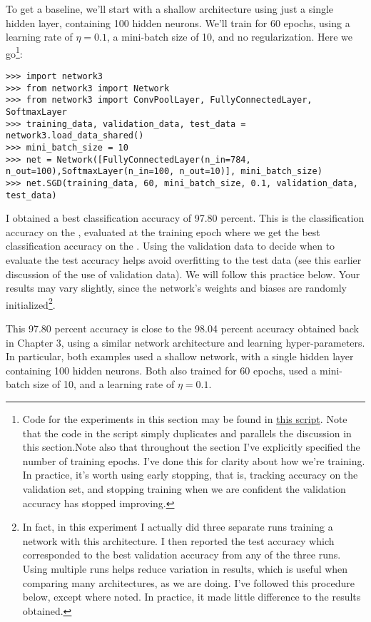 \documentclass[a4paper,twoside,10pt]{book}
\begin{document}
To get a baseline, we'll start with a shallow architecture using just a single hidden layer, containing 100 hidden neurons. We'll train for 60 epochs, using a learning rate of $\eta=0.1$, a mini-batch size of 10, and no regularization. Here we go\footnote{Code for the experiments in this section may be found in \href{https://github.com/mnielsen/neural-networks-and-deep-learning/blob/master/src/conv.py}{this script}. Note that the code in the script simply duplicates and parallels the discussion in this section.\newline Note also that throughout the section I've explicitly specified the number of training epochs. I've done this for clarity about how we're training. In practice, it's worth using early stopping, that is, tracking accuracy on the validation set, and stopping training when we are confident the validation accuracy has stopped improving.}:
\begin{lstlisting}
>>> import network3
>>> from network3 import Network
>>> from network3 import ConvPoolLayer, FullyConnectedLayer, SoftmaxLayer
>>> training_data, validation_data, test_data = network3.load_data_shared()
>>> mini_batch_size = 10
>>> net = Network([FullyConnectedLayer(n_in=784, n_out=100),SoftmaxLayer(n_in=100, n_out=10)], mini_batch_size)
>>> net.SGD(training_data, 60, mini_batch_size, 0.1, validation_data, test_data)
\end{lstlisting}
I obtained a best classification accuracy of 97.80 percent. This is the classification accuracy on the , evaluated at the training epoch where we get the best classification accuracy on the . Using the validation data to decide when to evaluate the test accuracy helps avoid overfitting to the test data (see this earlier discussion of the use of validation data). We will follow this practice below. Your results may vary slightly, since the network's weights and biases are randomly initialized\footnote{In fact, in this experiment I actually did three separate runs training a network with this architecture. I then reported the test accuracy which corresponded to the best validation accuracy from any of the three runs. Using multiple runs helps reduce variation in results, which is useful when comparing many architectures, as we are doing. I've followed this procedure below, except where noted. In practice, it made little difference to the results obtained.}.

This 97.80 percent accuracy is close to the 98.04 percent accuracy obtained back in Chapter 3, using a similar network architecture and learning hyper-parameters. In particular, both examples used a shallow network, with a single hidden layer containing 100 hidden neurons. Both also trained for 60 epochs, used a mini-batch size of 10, and a learning rate of $\eta=0.1$.
\end{document}
